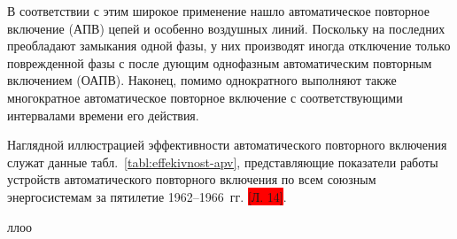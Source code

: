 В соответствии с этим широкое применение нашло автоматическое повторное включение (АПВ) цепей и особенно воздушных линий. Поскольку на последних преобладают замыкания одной фазы, у них производят иногда отключение только поврежденной фазы с после дующим однофазным автоматическим повторным включением (ОАПВ). Наконец, помимо однократного выполняют также многократное автоматическое повторное включение с соответствующими интервалами времени его действия.

Наглядной иллюстрацией эффективности автоматического повторного включения служат данные табл.~\ref{tabl:effekivnost-apv}, представляющие показатели работы устройств автоматического повторного включения по всем союзным энергосистемам за пятилетие 1962--1966~гг. \colorbox{red}{[Л. 14]}.

\cite{Zeilndzon69} ллоо 




